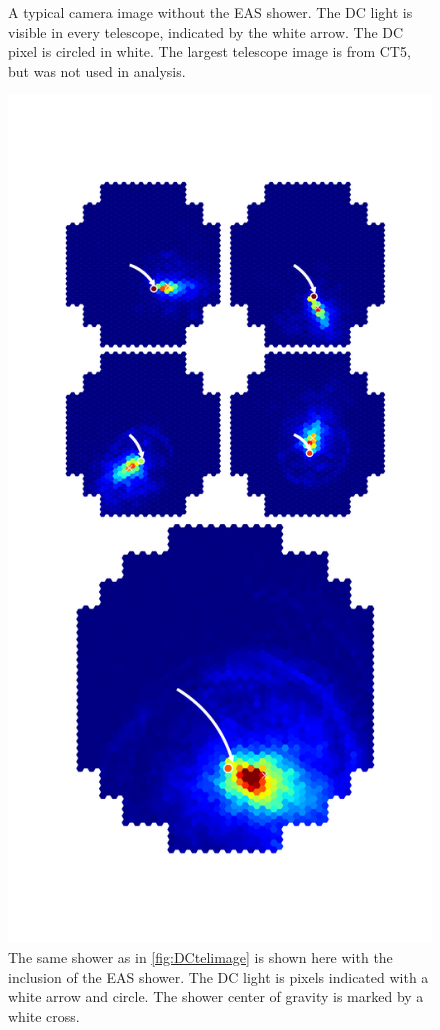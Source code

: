 \documentclass{article}
\begin{document}
\begin{figure}
\begin{minipage}{0.45\textwidth}
\caption{A typical camera image without the EAS shower. The DC light is visible in every telescope, indicated by the white arrow. The DC pixel is circled in white. The largest telescope image is from CT5, but was not used in analysis.}
\label{fig:DCtelimage}
\end{minipage}\hfill
\begin{minipage}{0.45\textwidth}
\centering
\includegraphics[trim=80 120 80 150,clip,width=\textwidth]{graphfull}
\caption{The same shower as in \ref{fig:DCtelimage} is shown here with the inclusion of the EAS shower. The DC light is pixels indicated with a white arrow and circle. The shower center of gravity is marked by a white cross.}
\label{fig:cutdistribution2}
\end{minipage}
\restoregeometry
\end{figure}
\end{document}

